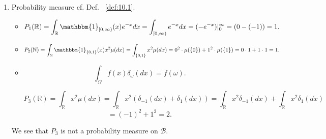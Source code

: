 \begin{exercise}[]
\begin{enumerate}[label=(\alph*)]
        \item Probability measure cf. Def. ~\ref{def:10.1}.
            \begin{itemize}
                \item 
                    \[
                    P_1(\mathbb{R}) = \int_{\mathbb{R}} \mathbbm{1}_{[0, \infty)}(x) e^{-x}dx
                    = \int_{[0, \infty)} e^{-x}dx 
                    = (-e^{-x})|_0^{\infty} = (0 - (-1)) = 1
                    .\] 
                \item
                    \[
                    P_2(\mathbb{N}) = \int_{\mathbb{N}} \mathbbm{1}_{\{0,1\} }(x) x^{2}\mu(dx) 
                    = \int_{\{0,1\} } x^{2}\mu(dx) = 0^{2}\cdot \mu(\{0\} ) + 1^{2}\cdot \mu(\{1\} ) 
                    = 0\cdot 1 + 1 \cdot 1 = 1
                    .\] 
                \item
                    \begin{tool}
                        \label{tool:iwrtadm} 
                        \[
                        \int_{\Omega} f(x) \delta_\omega(dx) = f(\omega)
                        .\] 
                    \end{tool}
                    \[
                    P_3(\mathbb{R}) = \int_{\mathbb{R}} x^{2}\mu(dx) 
                    = \int_{\mathbb{R}} x^{2} (\delta_{-1}(dx)+ \delta_1(dx))
                    = \int_{\mathbb{R}} x^{2} \delta_{-1}(dx) + \int_{\mathbb{R}}x^{2} \delta_1(dx)
                    \] 
                    \[
                    = (-1)^{2} + 1^{2} = 2
                    .\] 
            \end{itemize}
            We see that $P_3$ is not a probability measure on $\mathcal{B}$.


\end{enumerate}
\end{exercise}
